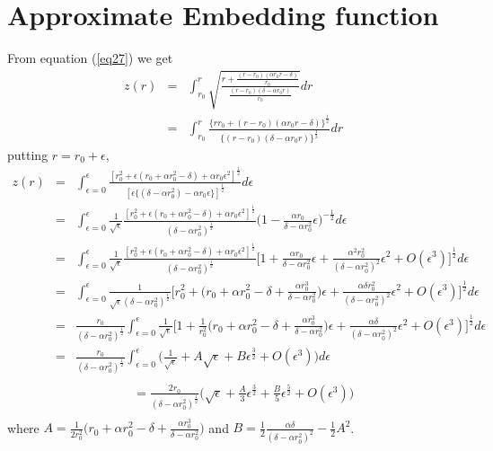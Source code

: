 \documentclass[10pt]{revtex4}
\begin{document}
\appendix
\section{Approximate Embedding function}
\label{sec:emb}
From equation (\ref{eq27}) we get
\begin{eqnarray}
z(r)&=&\int_{r_0}^{r}\sqrt{\frac{r+\frac{(r-r_0)(\alpha r_0r-\delta)}{r_0}}{\frac{(r-r_0)(\delta-\alpha r_0r)}{r_0}}}dr\\\nonumber
&=&\int_{r_0}^{r}\frac{\biggl\{rr_0+(r-r_0)(\alpha r_0r-\delta)\biggr\}^\frac{1}{2}}{\{(r-r_0)(\delta-\alpha r_0r)\}^\frac{1}{2}}dr
\end{eqnarray}
putting $r=r_0+\epsilon$,
\begin{eqnarray}
z(r)&=&\int_{\epsilon=0}^{\epsilon}\frac{[r_0^2+\epsilon(r_0+\alpha r_0^2-\delta)+\alpha r_0\epsilon^2]^\frac{1}{2}}{[\epsilon\{(\delta-\alpha r_0^2)-\alpha r_0\epsilon\}]^\frac{1}{2}}d\epsilon\\\nonumber
&=&\int_{\epsilon=0}^{\epsilon}\frac{1}{\sqrt{\epsilon}}\frac{[r_0^2+\epsilon(r_0+\alpha r_0^2-\delta)+\alpha r_0\epsilon^2]^\frac{1}{2}}{(\delta-\alpha r_0^2)^\frac{1}{2}}\biggl(1-\frac{\alpha r_0}{\delta-\alpha r_0^2}\epsilon\biggr)^{-\frac{1}{2}}d\epsilon\\\nonumber
&=&\int_{\epsilon=0}^{\epsilon}\frac{1}{\sqrt{\epsilon}}\frac{[r_0^2+\epsilon(r_0+\alpha r_0^2-\delta)+\alpha r_0\epsilon^2]^\frac{1}{2}}{(\delta-\alpha r_0^2)^\frac{1}{2}}\biggl[1+\frac{\alpha r_0}{\delta-\alpha r_0^2}\epsilon+\frac{\alpha^2 r_0^2}{(\delta-\alpha r_0^2)^2}\epsilon^2+O(\epsilon^3)\biggr]^{\frac{1}{2}}d\epsilon\\\nonumber
&=&\int_{\epsilon=0}^{\epsilon}\frac{1}{\sqrt{\epsilon}(\delta-\alpha r_0^2)^\frac{1}{2}}\biggl[r_0^2+\biggl(r_0+\alpha r_0^2-\delta+\frac{\alpha r_0^3}{\delta-\alpha r_0^2}\biggr)\epsilon+\frac{\alpha\delta r_0^2}{(\delta-\alpha r_0^2)^2}\epsilon^2+O(\epsilon^3)\biggr]^{\frac{1}{2}}d\epsilon\\\nonumber
&=&\frac{r_0}{(\delta-\alpha r_0^2)^\frac{1}{2}}\int_{\epsilon=0}^{\epsilon}\frac{1}{\sqrt{\epsilon}}\biggl[1+\frac{1}{r_0^2}\biggl(r_0+\alpha r_0^2-\delta+\frac{\alpha r_0^3}{\delta-\alpha r_0^2}\biggr)\epsilon+\frac{\alpha \delta}{(\delta-\alpha r_0^2)^2}\epsilon^2+O(\epsilon^3)\biggr]^{\frac{1}{2}}d\epsilon\\\nonumber
&=&\frac{r_0}{(\delta-\alpha r_0^2)^\frac{1}{2}}\int_{\epsilon=0}^{\epsilon}\biggl(\frac{1}{\sqrt{\epsilon}}+A\sqrt{\epsilon}+B\epsilon^\frac{3}{2}+O(\epsilon^3)\biggr)d\epsilon\\\nonumber
\end{eqnarray}
\begin{eqnarray}
&&=
\frac{2r_0}{(\delta-\alpha r_0^2)^\frac{1}{2}}\biggl(\sqrt{\epsilon}+\frac{A}{3}\epsilon^{\frac{3}{2}}+\frac{B}{5}\epsilon^\frac{5}{2}+O(\epsilon^3)\biggr)\\\nonumber\end{eqnarray}
where $A=\frac{1}{2r_0^2}\biggl(r_0+\alpha r_0^2-\delta+\frac{\alpha r_0^3}{\delta-\alpha r_0^2}\biggr)$ and $B=\frac{1}{2}\frac{\alpha \delta}{(\delta-\alpha r_0^2)^2}-\frac{1}{2}A^2$.
\end{document}
